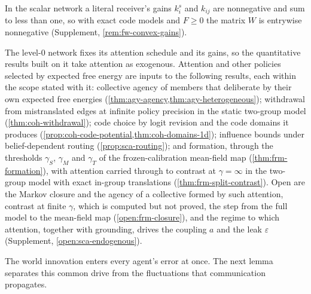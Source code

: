 In the scalar network a literal receiver's gains $k^s_i$ and $k_{ij}$ are nonnegative and sum to less than one, so with exact code models and $F\ge0$ the matrix $W$ is entrywise nonnegative (Supplement, \cref{rem:fw-convex-gains}).

The level-0 network fixes its attention schedule and its gains, so the quantitative results built on it take attention as exogenous. Attention and other policies selected by expected free energy are inputs to the following results, each within the scope stated with it: collective agency of members that deliberate by their own expected free energies (\cref{thm:agy-agency,thm:agy-heterogeneous}); withdrawal from mistranslated edges at infinite policy precision in the static two-group model (\cref{thm:coh-withdrawal}); code choice by logit revision and the code domains it produces (\cref{prop:coh-code-potential,thm:coh-domains-1d}); influence bounds under belief-dependent routing (\cref{prop:sca-routing}); and formation, through the thresholds $\gamma_S$, $\gamma_M$ and $\gamma_T$ of the frozen-calibration mean-field map (\cref{thm:frm-formation}), with attention carried through to contrast at $\gamma=\infty$ in the two-group model with exact in-group translations (\cref{thm:frm-split-contrast}). Open are the Markov closure and the agency of a collective formed by such attention, contrast at finite $\gamma$, which is computed but not proved, the step from the full model to the mean-field map (\cref{open:frm-closure}), and the regime to which attention, together with grounding, drives the coupling $a$ and the leak $\varepsilon$ (Supplement, \cref{open:sca-endogenous}).

The world innovation enters every agent's error at once. The next lemma separates this common drive from the fluctuations that communication propagates.

